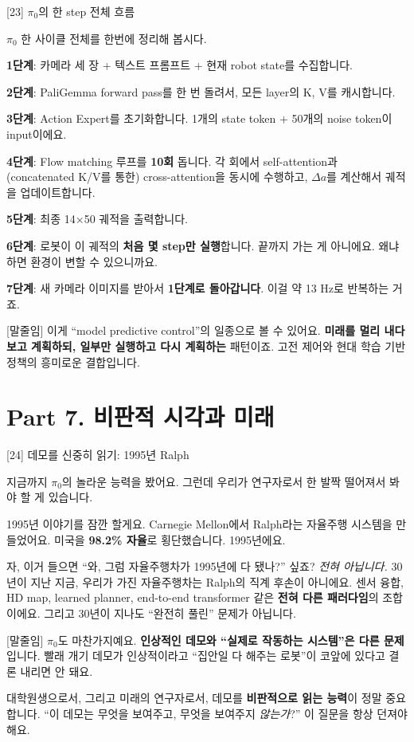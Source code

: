 \documentclass[aspectratio=169,10pt]{beamer}
\newenvironment{script}{%
  \footnotesize
  \setlength{\parskip}{0.5em}
  \setlength{\parindent}{0pt}
}{}
\begin{document}
\begin{frame}{[23] $\pi_0$의 한 step 전체 흐름}
\begin{script}
$\pi_0$ 한 사이클 전체를 한번에 정리해 봅시다.

\textbf{1단계}: 카메라 세 장 + 텍스트 프롬프트 + 현재 robot state를 수집합니다.

\textbf{2단계}: PaliGemma forward pass를 한 번 돌려서, 모든 layer의 K, V를 캐시합니다.

\textbf{3단계}: Action Expert를 초기화합니다. 1개의 state token + 50개의 noise token이 input이에요.

\textbf{4단계}: Flow matching 루프를 \textbf{10회} 돕니다. 각 회에서 self-attention과 (concatenated K/V를 통한) cross-attention을 동시에 수행하고, $\Delta a$를 계산해서 궤적을 업데이트합니다.

\textbf{5단계}: 최종 14×50 궤적을 출력합니다.

\textbf{6단계}: 로봇이 이 궤적의 \textbf{처음 몇 step만 실행}합니다. 끝까지 가는 게 아니에요. 왜냐하면 환경이 변할 수 있으니까요.

\textbf{7단계}: 새 카메라 이미지를 받아서 \textbf{1단계로 돌아갑니다}. 이걸 약 13 Hz로 반복하는 거죠.

[말줄임] 이게 ``model predictive control''의 일종으로 볼 수 있어요. \textbf{미래를 멀리 내다보고 계획하되, 일부만 실행하고 다시 계획하는} 패턴이죠. 고전 제어와 현대 학습 기반 정책의 흥미로운 결합입니다.
\end{script}
\end{frame}

\section{Part 7. 비판적 시각과 미래}

\begin{frame}{[24] 데모를 신중히 읽기: 1995년 Ralph}
\begin{script}
지금까지 $\pi_0$의 놀라운 능력을 봤어요. 그런데 우리가 연구자로서 한 발짝 떨어져서 봐야 할 게 있습니다.

1995년 이야기를 잠깐 할게요. Carnegie Mellon에서 Ralph라는 자율주행 시스템을 만들었어요. 미국을 \textbf{98.2\% 자율}로 횡단했습니다. 1995년에요.

자, 이거 들으면 ``와, 그럼 자율주행차가 1995년에 다 됐나?'' 싶죠? \textit{전혀 아닙니다.} 30년이 지난 지금, 우리가 가진 자율주행차는 Ralph의 직계 후손이 아니에요. 센서 융합, HD map, learned planner, end-to-end transformer 같은 \textbf{전혀 다른 패러다임}의 조합이에요. 그리고 30년이 지나도 ``완전히 풀린'' 문제가 아닙니다.

[말줄임] $\pi_0$도 마찬가지예요. \textbf{인상적인 데모와 ``실제로 작동하는 시스템''은 다른 문제}입니다. 빨래 개기 데모가 인상적이라고 ``집안일 다 해주는 로봇''이 코앞에 있다고 결론 내리면 안 돼요.

대학원생으로서, 그리고 미래의 연구자로서, 데모를 \textbf{비판적으로 읽는 능력}이 정말 중요합니다. ``이 데모는 무엇을 보여주고, 무엇을 보여주지 \emph{않는가}?'' 이 질문을 항상 던져야 해요.
\end{script}
\end{frame}
\end{document}
